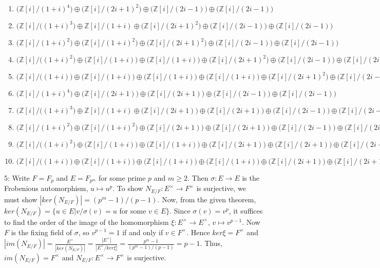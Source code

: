 \documentclass[12pt]{article}
\newcommand{\Z}{\mathbb{Z}}
\begin{document}
{{\begin{enumerate}
\item$\bigl(\Z[i]/(1+i)^4\bigr)\oplus\bigl(\Z[i]/(2i+1)^2\bigr)\oplus\bigl(\Z[i]/(2i-1)\bigr)\oplus\bigl(\Z[i]/(2i-1)\bigr)$
\item$\bigl(\Z[i]/((1+i)^3\bigr)\oplus\Z[i]/(1+i)\oplus\bigl(\Z[i]/(2i+1)^2\bigr)\oplus\bigl(\Z[i]/(2i-1)\bigr)\oplus\bigl(\Z[i]/(2i-1)\bigr)$
\item$\bigl(\Z[i]/(1+i)^2\bigr)\oplus\bigl(\Z[i]/(1+i)^2\bigr)\oplus\bigl(\Z[i]/(2i+1)^2\bigr)\oplus\bigl(\Z[i]/(2i-1)\bigr)\oplus\bigl(\Z[i]/(2i-1)\bigr)$
\item$\bigl(\Z[i]/((1+i)^2\bigr)\oplus\bigl(\Z[i]/(1+i)\bigr)\oplus\bigl(\Z[i]/(1+i)\bigr)\oplus\bigl(\Z[i]/(2i+1)^2\bigr)\oplus\bigl(\Z[i]/(2i-1)\bigr)\oplus\bigl(\Z[i]/(2i-1)\bigr)$
\item$\bigl(\Z[i]/((1+i)\bigr)\oplus\bigl(\Z[i]/(1+i)\bigr)\oplus\bigl(\Z[i]/(1+i)\bigr)\oplus\bigl(\Z[i]/(1+i)\bigr)\oplus\bigl(\Z[i]/(2i+1)^2\bigr)\oplus\bigl(\Z[i]/(2i-1)\bigr)\oplus\bigl(\Z[i]/(2i-1)\bigr)$
\item$\bigl(\Z[i]/(1+i)^4\bigr)\oplus\bigl(\Z[i]/(2i+1)\bigr)\oplus\bigl(\Z[i]/(2i+1)\bigr)\oplus\bigl(\Z[i]/(2i-1)\bigr)\oplus\bigl(\Z[i]/(2i-1)\bigr)$
\item$\bigl(\Z[i]/((1+i)^3\bigr)\oplus\Z[i]/(1+i)\oplus\bigl(\Z[i]/(2i+1)\bigr)\oplus\bigl(\Z[i]/(2i+1)\bigr)\oplus\bigl(\Z[i]/(2i-1)\bigr)\oplus\bigl(\Z[i]/(2i-1)\bigr)$
\item$\bigl(\Z[i]/(1+i)^2\bigr)\oplus\bigl(\Z[i]/(1+i)^2\bigr)\oplus\bigl(\Z[i]/(2i+1)\bigr)\oplus\bigl(\Z[i]/(2i+1)\bigr)\oplus\bigl(\Z[i]/(2i-1)\bigr)\oplus\bigl(\Z[i]/(2i-1)\bigr)$
\item$\bigl(\Z[i]/((1+i)^2\bigr)\oplus\bigl(\Z[i]/(1+i)\bigr)\oplus\bigl(\Z[i]/(1+i)\bigr)\oplus\bigl(\Z[i]/(2i+1)\bigr)\oplus\bigl(\Z[i]/(2i+1)\bigr)\oplus\bigl(\Z[i]/(2i-1)\bigr)\oplus\bigl(\Z[i]/(2i-1)\bigr)$
\item$\bigl(\Z[i]/((1+i)\bigr)\oplus\bigl(\Z[i]/(1+i)\bigr)\oplus\bigl(\Z[i]/(1+i)\bigr)\oplus\bigl(\Z[i]/(1+i)\bigr)\oplus\bigl(\Z[i]/(2i+1)\bigr)\oplus\bigl(\Z[i]/(2i+1)\bigr)\oplus\bigl(\Z[i]/(2i-1)\bigr)\oplus\bigl(\Z[i]/(2i-1)\bigr)$
\end{enumerate}
}
 \newline

5: Write $F=F_p$ and $E=F_{p^m}$ for some prime $p$ and $m\ge 2$. Then $\sigma:E\to E$ is the Frobenious automorphism, $u\mapsto u^p$. To show $N_{E/F}:E^\times\to F^\times$ is surjective, we must show $|ker(N_{E/F})|=(p^m-1)/(p-1)$. Now, from the given theorem, $ker(N_{E/F})=\{u\in E | v/\sigma(v)=u$ for some $v\in E\}$. Since $\sigma(v)=v^p$, it suffices to find the order of the image of the homomorphism $\xi:E^\times \to E^\times$, $v\mapsto v^{p-1}$. Now $F$ is the fixing field of $\sigma$, so $v^{p-1}=1$ if and only if $v\in F^\times$. Hence $ker\xi=F^\times$ and
$|im(N_{E/F})|=\frac{E^\times}{|ker(N_{E/F})|}=\frac{|E^\times|}{|E^\times / ker\xi|}=\frac{p^m-1}{(p^m-1)/(p-1)}=p-1.$
Thus, $im(N_{E/F})=F^\times$ and $N_{E/F}:E^\times\to F^\times$ is surjective. \newline


}
\end{document}
